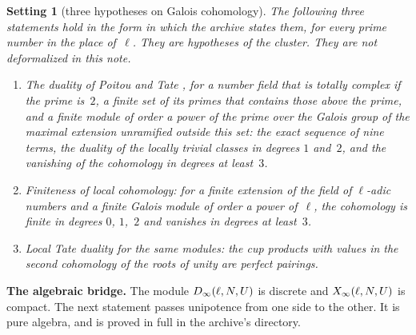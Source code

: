 \documentclass[11pt,a4paper]{article}
\newcommand{\m}[1]{\mbox{$#1$}}        %
\newcommand{\subhead}[1]{\par\addvspace{9pt plus 2pt}\Needspace{4\baselineskip}\noindent\textbf{#1}\enspace\ignorespaces}
\theoremstyle{plainx}
\theoremstyle{uprightx}
\newtheorem{setting}[theorem]{Setting}
\begin{document}
\begin{setting}[three hypotheses on Galois cohomology]\label{set:coh}
The following three statements hold in the form in which the archive states them, for every prime number in the
place of~$\ell$. They are hypotheses of the cluster. They are not deformalized in this note.
\begin{enumerate}[label=\textup{(\alph*)},topsep=2pt,itemsep=1pt]
\item \emph{The duality of Poitou and Tate} \cite[VIII, §6]{NSW}, for a number field that is totally complex if the
prime is~$2$, a finite set of its primes that contains those above the prime, and a finite module of order a power
of the prime over the Galois group of the maximal extension unramified outside this set: the exact sequence of nine
terms, the duality of the locally trivial classes in degrees $1$ and~$2$, and the vanishing of the cohomology in
degrees at least~$3$.
\item \emph{Finiteness of local cohomology}: for a finite extension of the field of $\ell$-adic numbers and a finite
Galois module of order a power of~$\ell$, the cohomology is finite in degrees $0$, $1$,~$2$ and vanishes in degrees
at least~$3$.
\item \emph{Local Tate duality} for the same modules: the cup products with values in the second cohomology of the
roots of unity are perfect pairings.
\end{enumerate}
\end{setting}

\subhead{The algebraic bridge.} The module \m{\Dinf{\ell}{N}{U}} is discrete and \m{\Xinf{\ell}{N}{U}} is
compact. The next statement passes unipotence from one side to the other. It is pure algebra, and is proved in full
in the archive's directory.
\end{document}
